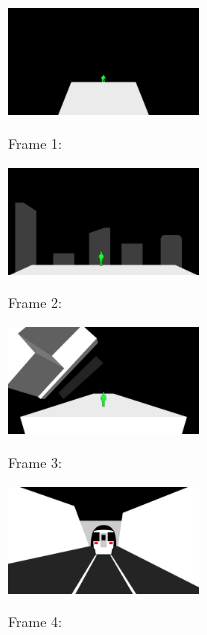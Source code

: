 \documentclass{article}
\begin{document}
\begin{figure}[!ht]
  \fcapside
  {
    \captionsetup{labelformat=empty}
    \caption{Frame 1:}
  }
  {\includegraphics[width=0.45\textwidth]{Frame1.png}}
\end{figure}

\begin{figure}[!ht]
  \fcapside
  {
    \captionsetup{labelformat=empty}
    \caption{Frame 2:}
  }
  {\includegraphics[width=0.45\textwidth]{Frame2.png}}
\end{figure}

\pagebreak

\begin{figure}[!ht]
  \fcapside
  {
    \captionsetup{labelformat=empty}
    \caption{Frame 3:}
  }
  {\includegraphics[width=0.45\textwidth]{Frame3.png}}
\end{figure}

\begin{figure}[!ht]
  \fcapside
  {
    \captionsetup{labelformat=empty}
    \caption{Frame 4:}
  }
  {\includegraphics[width=0.45\textwidth]{Frame4.png}}
\end{figure}
\end{document}
